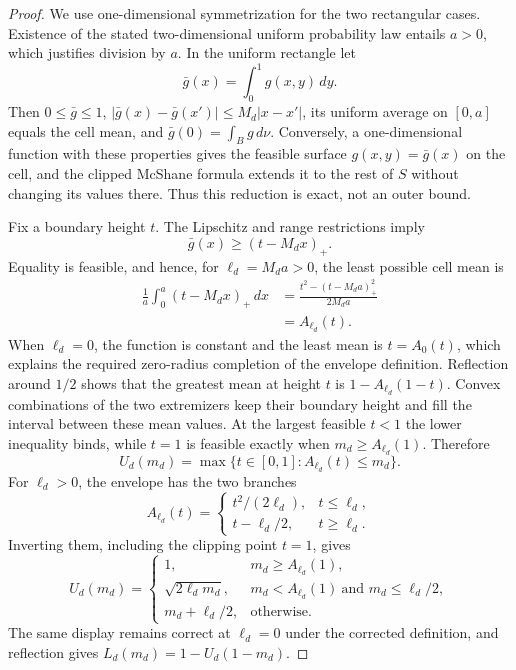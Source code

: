 \documentclass{article}
\begin{document}
\begin{proof}
We use one-dimensional symmetrization for the two rectangular cases.  Existence
of the stated two-dimensional uniform probability law entails \(a>0\), which
justifies division by \(a\).  In the uniform rectangle let
\[
 \bar g(x)=\int_0^1g(x,y)\,dy.
\]
Then \(0\leq\bar g\leq1\),
\(\lvert\bar g(x)-\bar g(x')\rvert\leq M_d\lvert x-x'\rvert\), its uniform
average on \([0,a]\) equals the cell mean, and
\(\bar g(0)=\int_Bg\,d\nu\).  Conversely, a one-dimensional function with
these properties gives the feasible surface \(g(x,y)=\bar g(x)\) on the cell,
and the clipped McShane formula extends it to the rest of \(S\) without changing
its values there.  Thus this reduction is exact, not an outer bound.

Fix a boundary height \(t\).  The Lipschitz and range restrictions imply
\[
 \bar g(x)\geq(t-M_dx)_+.
\]
Equality is feasible, and hence, for \(\ell_d=M_da>0\), the least possible cell
mean is
\[
\begin{split}
 \frac1a\int_0^a(t-M_dx)_+\,dx
 &=\frac{t^2-(t-M_da)_+^2}{2M_da}\\
 &=A_{\ell_d}(t).
\end{split}
\]
When \(\ell_d=0\), the function is constant and the least mean is \(t=A_0(t)\),
which explains the required zero-radius completion of the envelope definition.
Reflection around \(1/2\) shows that the greatest mean at height \(t\) is
\(1-A_{\ell_d}(1-t)\).  Convex combinations of the two extremizers keep their
boundary height and fill the interval between these mean values.  At the largest
feasible \(t<1\) the lower inequality binds, while \(t=1\) is feasible exactly
when \(m_d\geq A_{\ell_d}(1)\).  Therefore
\[
 U_d(m_d)=\max\{t\in[0,1]:A_{\ell_d}(t)\leq m_d\}.
\]
For \(\ell_d>0\), the envelope has the two branches
\[
 A_{\ell_d}(t)=
 \begin{cases}
 t^2/(2\ell_d),&t\leq\ell_d,\\
 t-\ell_d/2,&t\geq\ell_d.
 \end{cases}
\]
Inverting them, including the clipping point \(t=1\), gives
\[
U_d(m_d)=\begin{cases}
1,&m_d\geq A_{\ell_d}(1),\\
\sqrt{2\ell_dm_d},&m_d<A_{\ell_d}(1)\ \text{and }m_d\leq\ell_d/2,\\
m_d+\ell_d/2,&\text{otherwise}.
\end{cases}
\]
The same display remains correct at \(\ell_d=0\) under the corrected definition,
and reflection gives \(L_d(m_d)=1-U_d(1-m_d)\).


\end{proof}
\end{document}
